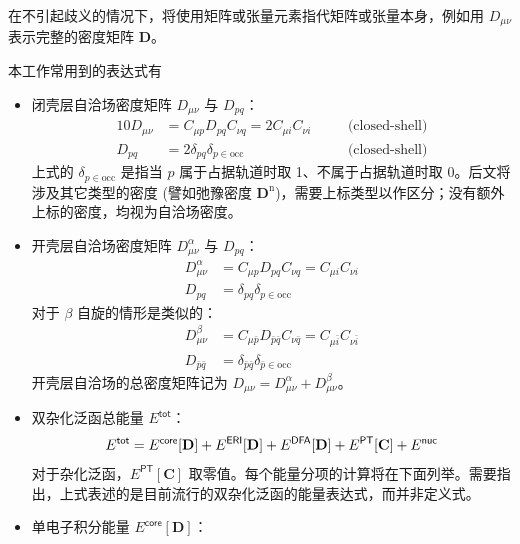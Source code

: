 在不引起歧义的情况下，将使用矩阵或张量元素指代矩阵或张量本身，例如用 $D_{\mu \nu}$ 表示完整的密度矩阵 $\mathbf{D}$。

本工作常用到的表达式有
\begin{itemize}[nosep]
  \item 闭壳层自洽场密度矩阵 $D_{\mu \nu}$ 与 $D_{pq}$：
        \begin{alignat}{10}
          D_{\mu \nu} &= C_{\mu p} D_{pq} C_{\nu q} = 2 C_{\mu i} C_{\nu i} \quad &&\text{(closed-shell)} \\
          D_{pq} &= 2 \delta_{pq} \delta_{p \in \mathrm{occ}} \quad &&\text{(closed-shell)}
        \end{alignat}
        上式的 $\delta_{p \in \mathrm{occ}}$ 是指当 $p$ 属于占据轨道时取 1、不属于占据轨道时取 0。后文将涉及其它类型的密度 (譬如弛豫密度 $\mathbf{D}^\mathrm{n}$)，需要上标类型以作区分；没有额外上标的密度，均视为自洽场密度。
  \item 开壳层自洽场密度矩阵 $D_{\mu \nu}^\alpha$ 与 $D_{pq}$：
        \begin{align}
          D_{\mu \nu}^\alpha &= C_{\mu p} D_{pq} C_{\nu q} = C_{\mu i} C_{\nu i} \\
          D_{pq} &= \delta_{pq} \delta_{p \in \mathrm{occ}}
        \end{align}
        对于 $\beta$ 自旋的情形是类似的：
        \begin{align}
          D_{\mu \nu}^\beta &= C_{\mu \bar p} D_{\bar p \bar q} C_{\nu \bar q} = C_{\mu \bar i} C_{\nu \bar i} \\
          D_{\bar p \bar q} &= \delta_{\bar p \bar q} \delta_{\bar p \in \mathrm{occ}}
        \end{align}
        开壳层自洽场的总密度矩阵记为 $D_{\mu \nu} = D_{\mu \nu}^\alpha + D_{\mu \nu}^\beta$。
  \item 双杂化泛函总能量 $E^\textsf{tot}$：
        \begin{equation}
          \label{eq.def-E-tot}
          E^\textsf{tot} = E^\textsf{core} [\mathbf{D}] + E^\textsf{ERI} [\mathbf{D}] + E^\textsf{DFA} [\mathbf{D}] + E^\textsf{PT} [\mathbf{C}] + E^\textsf{nuc} \\
        \end{equation}
        对于杂化泛函，$E^\textsf{PT} [\mathbf{C}]$ 取零值。每个能量分项的计算将在下面列举。需要指出，上式表述的是目前流行的双杂化泛函的能量表达式，而并非定义式。
  \item 单电子积分能量 $E^\textsf{core} [\mathbf{D}]$：
        \begin{equation}

\end{equation}
\end{itemize}
